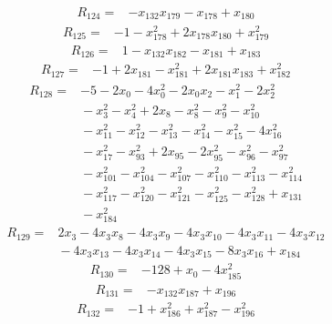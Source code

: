 {\begin{align*}
R_{124} ={}& -x_{132} x_{179} - x_{178} + x_{180}
\end{align*}
\begin{align*}
R_{125} ={}& -1 - x_{178}^{2} + 2x_{178} x_{180} + x_{179}^{2}
\end{align*}
\begin{align*}
R_{126} ={}& 1 - x_{132} x_{182} - x_{181} + x_{183}
\end{align*}
\begin{align*}
R_{127} ={}& -1 + 2x_{181} - x_{181}^{2} + 2x_{181} x_{183} + x_{182}^{2}
\end{align*}
\begin{align*}
R_{128} ={}& -5 - 2x_{0} - 4x_{0}^{2} - 2x_{0} x_{2} - x_{1}^{2} - 2x_{2}^{2} \\
&{}  - x_{3}^{2} - x_{4}^{2} + 2x_{8} - x_{8}^{2} - x_{9}^{2} - x_{10}^{2} \\
&{}  - x_{11}^{2} - x_{12}^{2} - x_{13}^{2} - x_{14}^{2} - x_{15}^{2} - 4x_{16}^{2} \\
&{}  - x_{17}^{2} - x_{93}^{2} + 2x_{95} - 2x_{95}^{2} - x_{96}^{2} - x_{97}^{2} \\
&{}  - x_{101}^{2} - x_{104}^{2} - x_{107}^{2} - x_{110}^{2} - x_{113}^{2} - x_{114}^{2} \\
&{}  - x_{117}^{2} - x_{120}^{2} - x_{121}^{2} - x_{125}^{2} - x_{128}^{2} + x_{131} \\
&{}  - x_{184}^{2}
\end{align*}
\begin{align*}
R_{129} ={}& 2x_{3} - 4x_{3} x_{8} - 4x_{3} x_{9} - 4x_{3} x_{10} - 4x_{3} x_{11} - 4x_{3} x_{12} \\
&{}  - 4x_{3} x_{13} - 4x_{3} x_{14} - 4x_{3} x_{15} - 8x_{3} x_{16} + x_{184}
\end{align*}
\begin{align*}
R_{130} ={}& -128 + x_{0} - 4x_{185}^{2}
\end{align*}
\begin{align*}
R_{131} ={}& -x_{132} x_{187} + x_{196}
\end{align*}
\begin{align*}
R_{132} ={}& -1 + x_{186}^{2} + x_{187}^{2} - x_{196}^{2}
\end{align*}
}
